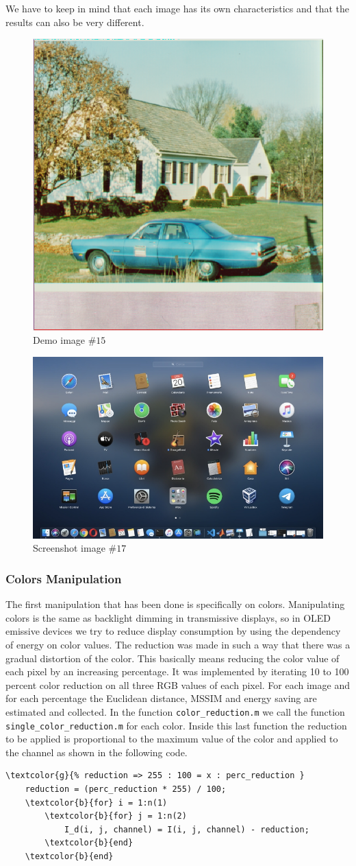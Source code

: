 \documentclass[a4paper]{article}
\begin{document}
        We have to keep in mind that each image has its own characteristics and that the results can also be very different.

        \begin{figure}[htp]
            \centering
            \includegraphics[width=0.2\columnwidth]{./screenshots/im_15.png}
            \caption{\label{fig:im15}\centering Demo image $\#15$}
        \end{figure}

       \begin{figure}[htp]
            \centering
            \includegraphics[width=0.3\columnwidth]{./screenshots/img_17.png}
            \caption{\label{fig:im17}\centering Screenshot image $\#17$}
        \end{figure}


        \subsubsection{Colors Manipulation}
        The first manipulation that has been done is specifically on colors. Manipulating colors is the same as backlight dimming in transmissive displays, so in OLED emissive devices we try to reduce display consumption by using the dependency of energy on color values.
        The reduction was made in such a way that there was a gradual distortion of the color. This basically means reducing the color value of each pixel by an increasing percentage. It was implemented by iterating 10 to 100 percent color reduction on all three RGB values of each pixel. For each image and for each percentage the Euclidean distance, MSSIM and energy saving are estimated and collected. In the function \texttt{color\_reduction.m} we call the function \texttt{single\_color\_reduction.m} for each color. Inside this last function the reduction to be applied is proportional to the maximum value of the color and applied to the channel as shown in the following code.
        \begin{Verbatim}[commandchars=\\\{\}]
    \textcolor{g}{% reduction => 255 : 100 = x : perc_reduction }
    reduction = (perc_reduction * 255) / 100;
    \textcolor{b}{for} i = 1:n(1)
        \textcolor{b}{for} j = 1:n(2)
            I_d(i, j, channel) = I(i, j, channel) - reduction;
        \textcolor{b}{end}
    \textcolor{b}{end}
        \end{Verbatim}
\end{document}
